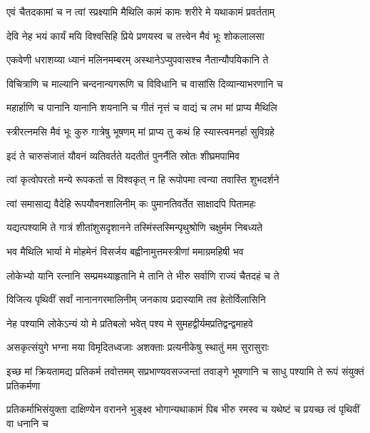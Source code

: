 \twolineshloka
{एवं चैतदकामां च न त्वां स्प्रक्ष्यामि मैथिलि}
{कामं कामः शरीरे मे यथाकामं प्रवर्तताम्} %

\twolineshloka
{देवि नेह भयं कार्यं मयि विश्वसिहि प्रिये}
{प्रणयस्व च तत्त्वेन मैवं भूः शोकलालसा} %

\twolineshloka
{एकवेणी धराशय्या ध्यानं मलिनमम्बरम्}
{अस्थानेऽप्युपवासश्च नैतान्यौपयिकानि ते} %

\twolineshloka
{विचित्राणि च माल्यानि चन्दनान्यगरूणि च}
{विविधानि च वासांसि दिव्यान्याभरणानि च} %

\twolineshloka
{महार्हाणि च पानानि यानानि शयनानि च}
{गीतं नृत्तं च वाद्यं च लभ मां प्राप्य मैथिलि} %

\twolineshloka
{स्त्रीरत्नमसि मैवं भूः कुरु गात्रेषु भूषणम्}
{मां प्राप्य तु कथं हि स्यास्त्वमनर्हा सुविग्रहे} %

\twolineshloka
{इदं ते चारुसंजातं यौवनं व्यतिवर्तते}
{यदतीतं पुनर्नैति स्रोतः शीघ्रमपामिव} %

\twolineshloka
{त्वां कृत्वोपरतो मन्ये रूपकर्ता स विश्वकृत्}
{न हि रूपोपमा त्वन्या तवास्ति शुभदर्शने} %

\twolineshloka
{त्वां समासाद्य वैदेहि रूपयौवनशालिनीम्}
{कः पुमानतिवर्तेत साक्षादपि पितामहः} %

\twolineshloka
{यद्यत्पश्यामि ते गात्रं शीतांशुसदृशानने}
{तस्मिंस्तस्मिन्पृथुश्रोणि चक्षुर्मम निबध्यते} %

\twolineshloka
{भव मैथिलि भार्या मे मोहमेनं विसर्जय}
{बह्वीनामुत्तमस्त्रीणां ममाग्रमहिषी भव} %

\twolineshloka
{लोकेभ्यो यानि रत्नानि सम्प्रमथ्याहृतानि मे}
{तानि ते भीरु सर्वाणि राज्यं चैतदहं च ते} %

\twolineshloka
{विजित्य पृथिवीं सर्वां नानानगरमालिनीम्}
{जनकाय प्रदास्यामि तव हेतोर्विलासिनि} %

\twolineshloka
{नेह पश्यामि लोकेऽन्यं यो मे प्रतिबलो भवेत्}
{पश्य मे सुमहद्वीर्यमप्रतिद्वन्द्वमाहवे} %

\twolineshloka
{असकृत्संयुगे भग्ना मया विमृदितध्वजाः}
{अशक्ताः प्रत्यनीकेषु स्थातुं मम सुरासुराः} %

\threelineshloka
{इच्छ मां क्रियतामद्य प्रतिकर्म तवोत्तमम्}
{सप्रभाण्यवसज्जन्तां तवाङ्गे भूषणानि च}
{साधु पश्यामि ते रूपं संयुक्तं प्रतिकर्मणा} %

\threelineshloka
{प्रतिकर्माभिसंयुक्ता दाक्षिण्येन वरानने}
{भुङ्क्ष्व भोगान्यथाकामं पिब भीरु रमस्व च}
{यथेष्टं च प्रयच्छ त्वं पृथिवीं वा धनानि च} %

